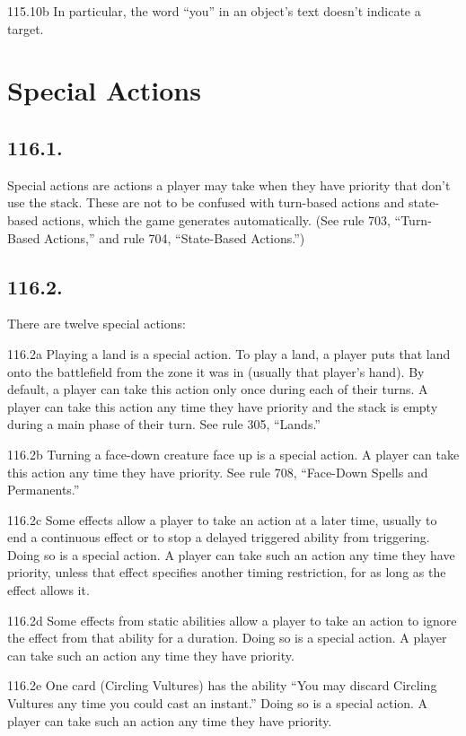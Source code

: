 115.10b In particular, the word “you” in an object’s text doesn’t indicate a target.

\section{Special Actions}
\subsection*{116.1.}
Special actions are actions a player may take when they have priority that don’t use the stack. These are not to be confused with turn-based actions and state-based actions, which the game generates automatically. (See rule 703, “Turn-Based Actions,” and rule 704, “State-Based Actions.”)

\subsection*{116.2.}
There are twelve special actions:

116.2a Playing a land is a special action. To play a land, a player puts that land onto the battlefield from the zone it was in (usually that player’s hand). By default, a player can take this action only once during each of their turns. A player can take this action any time they have priority and the stack is empty during a main phase of their turn. See rule 305, “Lands.”

116.2b Turning a face-down creature face up is a special action. A player can take this action any time they have priority. See rule 708, “Face-Down Spells and Permanents.”

116.2c Some effects allow a player to take an action at a later time, usually to end a continuous effect or to stop a delayed triggered ability from triggering. Doing so is a special action. A player can take such an action any time they have priority, unless that effect specifies another timing restriction, for as long as the effect allows it.

116.2d Some effects from static abilities allow a player to take an action to ignore the effect from that ability for a duration. Doing so is a special action. A player can take such an action any time they have priority.

116.2e One card (Circling Vultures) has the ability “You may discard Circling Vultures any time you could cast an instant.” Doing so is a special action. A player can take such an action any time they have priority.

